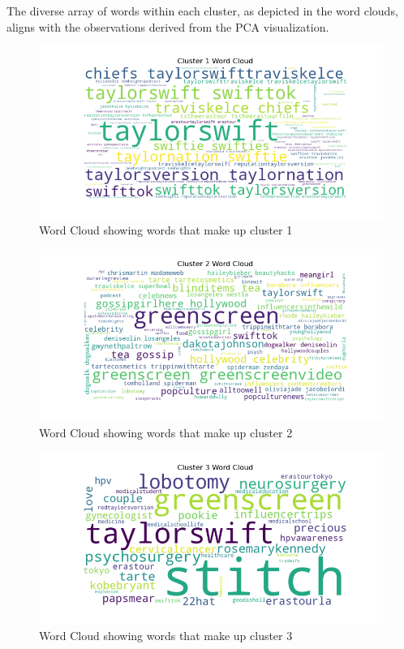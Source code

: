 \documentclass[acmtog]{acmart}
\begin{document}
The diverse array of words within each cluster, as depicted in the word clouds, aligns with the observations derived from the PCA visualization.

\begin{figure}[ht]
  \centering
  \includegraphics[width=0.8\linewidth]{cluster_1_wordcloud.png} 
  \caption{Word Cloud showing words that make up cluster 1}
  \label{fig:WordsInCluster1}
  \end{figure}

\begin{figure}[ht]
  \includegraphics[width=0.8\linewidth]{cluster_2_wordcloud.png} 
  \caption{Word Cloud showing words that make up cluster 2}
  \label{fig:WordsInCluster2}
\end{figure}

\begin{figure}[ht]
  \includegraphics[width=0.8\linewidth]{cluster_3_wordcloud.png} 
  \caption{Word Cloud showing words that make up cluster 3}
  \label{fig:WordsInCluster3}
\end{figure}
\end{document}
